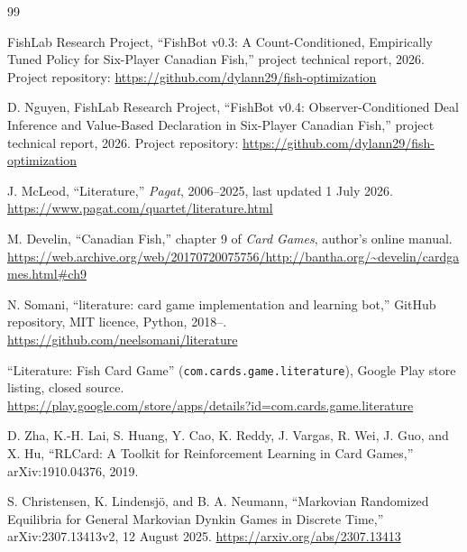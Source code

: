 \begin{thebibliography}{99}


FishLab Research Project, ``FishBot v0.3: A Count-Conditioned, Empirically Tuned
Policy for Six-Player Canadian Fish,'' project technical report, 2026. Project
repository: \url{https://github.com/dylann29/fish-optimization}

D. Nguyen, FishLab Research Project, ``FishBot v0.4: Observer-Conditioned Deal
Inference and Value-Based Declaration in Six-Player Canadian Fish,'' project
technical report, 2026. Project repository:
\url{https://github.com/dylann29/fish-optimization}

J. McLeod, ``Literature,'' \emph{Pagat}, 2006--2025, last updated 1 July 2026.\\
\url{https://www.pagat.com/quartet/literature.html}

M. Develin, ``Canadian Fish,'' chapter 9 of \emph{Card Games}, author's online
manual.\\
\url{https://web.archive.org/web/20170720075756/http://bantha.org/~develin/cardgames.html\#ch9}

N. Somani, ``literature: card game implementation and learning bot,'' GitHub
repository, MIT licence, Python, 2018--.\\
\url{https://github.com/neelsomani/literature}

``Literature: Fish Card Game'' (\texttt{com.cards.game.literature}), Google Play
store listing, closed source.\\
\url{https://play.google.com/store/apps/details?id=com.cards.game.literature}

D. Zha, K.-H. Lai, S. Huang, Y. Cao, K. Reddy, J. Vargas, R. Wei, J. Guo, and
X. Hu, ``RLCard: A Toolkit for Reinforcement Learning in Card Games,''
arXiv:1910.04376, 2019.


S. Christensen, K. Lindensj\"o, and B. A. Neumann, ``Markovian Randomized
Equilibria for General Markovian Dynkin Games in Discrete Time,''
arXiv:2307.13413v2, 12 August 2025. \url{https://arxiv.org/abs/2307.13413}


\end{thebibliography}
